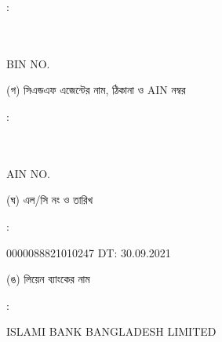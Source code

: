 \documentclass[12pt]{article}
\newcommand{\lcno}{0000088821010247}
\newcommand{\lcdt}{30.09.2021}
\newcommand{\lienbank}{ISLAMI BANK BANGLADESH LIMITED}
\newcommand{\impn}{\jeal}
\newcommand{\impadd}{\jeala}
\newcommand{\impbin}{\jealbin}
\begin{document}
\begin{minipage}[t]{0.02\linewidth}
:
\end{minipage}
\begin{minipage}[t]{0.53\linewidth}
\textbf{{\impn}}
\\
{\impadd}
\\
BIN NO. {\impbin}
\\
\end{minipage}
\begin{minipage}[t]{0.05\linewidth}
\hspace*{1em}
\end{minipage}
\begin{minipage}[t]{0.40\linewidth}
(গ) সিএন্ডএফ এজেন্টের নাম, ঠিকানা
ও AIN নম্বর
\end{minipage}
\begin{minipage}[t]{0.02\linewidth}
:
\end{minipage}
\begin{minipage}[t]{0.53\linewidth}
\textbf{{\cnfn}}
\\
{\cnfadd}
\\
AIN NO. {\cnfain}
\\
\end{minipage}
\begin{minipage}[t]{0.05\linewidth}
\hspace*{1em}
\end{minipage}
\begin{minipage}[t]{0.40\linewidth}
(ঘ) এল/সি নং ও তারিখ
\end{minipage}
\begin{minipage}[t]{0.02\linewidth}
:
\end{minipage}
\begin{minipage}[t]{0.53\linewidth}
{\lcno} \hspace{2em} DT: {\lcdt}
\\
\end{minipage}
\begin{minipage}[t]{0.05\linewidth}
\hspace*{1em}
\end{minipage}
\begin{minipage}[t]{0.40\linewidth}
(ঙ) লিয়েন ব্যাংকের নাম
\end{minipage}
\begin{minipage}[t]{0.02\linewidth}
:
\end{minipage}
\begin{minipage}[t]{0.53\linewidth}
{\lienbank}
\\
\end{minipage}
\end{document}
